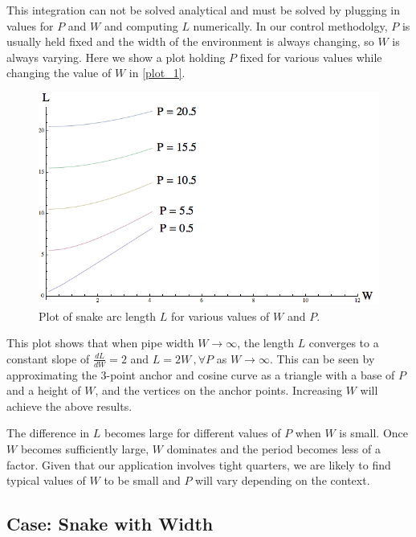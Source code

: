 This integration can not be solved analytical and must be solved by plugging in values for $P$ and $W$ and computing $L$ numerically. In our control methodolgy, $P$ is usually held fixed and the width of the environment is always changing, so $W$ is always varying. Here we show a plot holding $P$ fixed for various values while changing the value of $W$ in \autoref{plot_1}.

\begin{figure}[htbp]
\centering
\includegraphics[keepaspectratio,width=400pt,height=0.75\textheight]{2011_01_23_Plot_DegenerateAnchor.png}
\caption{Plot of snake arc length $L$ for various values of $W$ and $P$.}
\label{plot_1}
\end{figure}



This plot shows that when pipe width $W \to \infty$, the length $L$ converges to a constant slope of $\frac{dL}{dW} = 2$ and $L = 2W \,, \forall P$ as $W \to \infty$. This can be seen by approximating the 3-point anchor and cosine curve as a triangle with a base of $P$ and a height of $W$, and the vertices on the anchor points. Increasing $W$ will achieve the above results.

The difference in $L$ becomes large for different values of $P$ when $W$ is small. Once $W$ becomes sufficiently large, $W$ dominates and the period becomes less of a factor. Given that our application involves tight quarters, we are likely to find typical values of $W$ to be small and $P$ will vary depending on the context.

\subsection{Case: Snake with Width}
\label{case:snakewithwidth}

